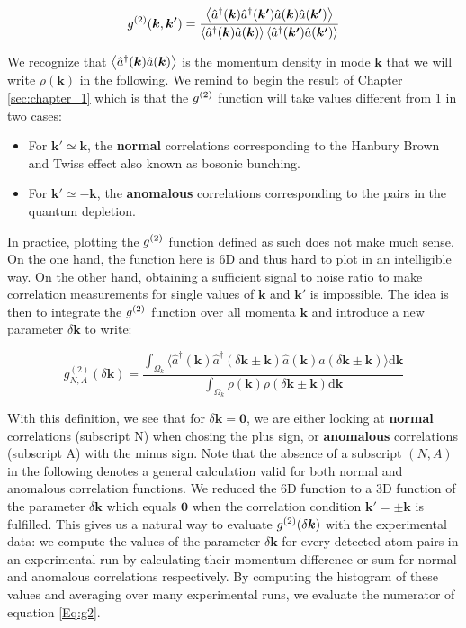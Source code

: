 \begin{equation}
    g^{(2)} (\bm{k},\bm{k'}) = \frac{\left\langle\hat{a}^{\dagger}(\bm{k}) \hat{a}^{\dagger}(\bm{k'}) \hat{a}(\bm{k}) \hat{a}(\bm{k'})\right\rangle}{\left\langle\hat{a}^{\dagger}(\bm{k}) \hat{a}(\bm{k}) \right\rangle \left\langle\hat{a}^{\dagger}(\bm{k'}) \hat{a}(\bm{k'}) \right\rangle}
\end{equation}

\noindent We recognize that $\left\langle\hat{a}^{\dagger}(\bm{k}) \hat{a}(\bm{k})\right\rangle$ is the momentum density in mode $\bm{k}$ that we will write $\rho(\bm{k})$ in the following. We remind to begin the result of Chapter \ref{sec:chapter_1} which is that the $g^{(2)}$ function will take values different from 1 in two cases:

\begin{itemize}
    \item For $\bm{k'} \simeq \bm{k}$, the \textbf{normal} correlations corresponding to the Hanbury Brown and Twiss effect also known as bosonic bunching.
    \item For $\bm{k'} \simeq -\bm{k}$, the \textbf{anomalous} correlations corresponding to the \kmk pairs in the quantum depletion.
\end{itemize}

In practice, plotting the $g^{(2)}$ function defined as such does not make much sense. On the one hand, the function here is 6D and thus hard to plot in an intelligible way. On the other hand, obtaining a sufficient signal to noise ratio to make correlation measurements for single values of $\bm{k}$ and $\bm{k'}$ is impossible. The idea is then to integrate the $g^{(2)}$ function over all momenta $\bm{k}$ and introduce a new parameter $\delta \bm{k}$ to write:

\begin{equation}
    g_{N,A}^{(2)} (\delta {\bm k})=\frac{\int_{\Omega_{k}} \langle \hat{a}^{\dagger}({\bm k}) \hat{a}^{\dagger}(\delta {\bm k} \pm {\bm k}) \hat{a}({\bm k}) \hat{a}(\delta {\bm k} \pm {\bm k}) \rangle \mathrm{d}{\bm k}}{\int_{\Omega_{k}} \rho({\bm k}) \rho(\delta {\bm k} \pm {\bm k}) \mathrm{d}\bm{k}}
    \label{Eq:g2}
\end{equation}

\noindent With this definition, we see that for $\delta \bm{k}=\bm{0}$, we are either looking at \textbf{normal} \kk correlations (subscript N) when chosing the plus sign, or \textbf{anomalous} \kmk correlations (subscript A) with the minus sign. Note that the absence of a subscript $(N,A)$ in the following denotes a general calculation valid for both normal and anomalous correlation functions. We reduced the 6D function to a 3D function of the parameter $\delta \bm{k}$ which equals $\bm{0}$ when the correlation condition $\bm{k'} = \pm \bm{k}$ is fulfilled. This gives us a natural way to evaluate $g^{(2)} (\delta \bm{k})$ with the experimental data: we compute the values of the parameter $\delta \bm{k}$ for every detected atom pairs in an experimental run by calculating their momentum difference or sum for normal and anomalous correlations respectively. By computing the histogram of these values and averaging over many experimental runs, we evaluate the numerator of equation \ref{Eq:g2}.

